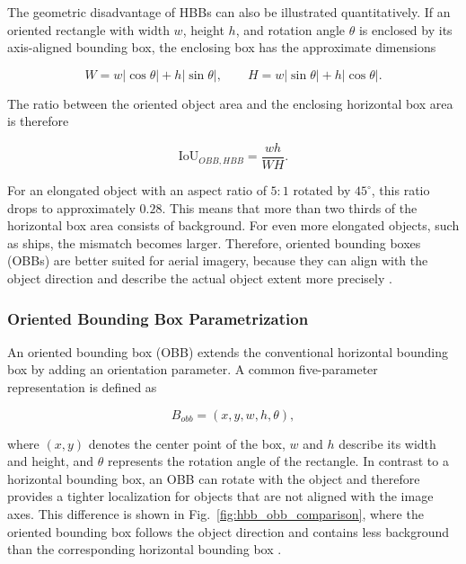 The geometric disadvantage of HBBs can also be illustrated quantitatively. If an oriented rectangle with width $w$, height $h$, and rotation angle $\theta$ is enclosed by its axis-aligned bounding box, the enclosing box has the approximate dimensions

\begin{equation}
    W = w|\cos\theta| + h|\sin\theta|,
    \qquad
    H = w|\sin\theta| + h|\cos\theta|.
\end{equation}

The ratio between the oriented object area and the enclosing horizontal box area is therefore

\begin{equation}
    \mathrm{IoU}_{OBB,HBB}
    =
    \frac{w h}{W H}.
\end{equation}

For an elongated object with an aspect ratio of $5:1$ rotated by $45^\circ$, this ratio drops to approximately $0.28$. This means that more than two thirds of the horizontal box area consists of background. For even more elongated objects, such as ships, the mismatch becomes larger. Therefore, oriented bounding boxes (OBBs) are better suited for aerial imagery, because they can align with the object direction and describe the actual object extent more precisely \cite{ding2021object,ding2018learning}.

\subsubsection{Oriented Bounding Box Parametrization}

An oriented bounding box (OBB) extends the conventional horizontal bounding box by adding an orientation parameter. A common five-parameter representation is defined as

\begin{equation}
    B_{obb} = (x, y, w, h, \theta),
\end{equation}

where $(x,y)$ denotes the center point of the box, $w$ and $h$ describe its width and height, and $\theta$ represents the rotation angle of the rectangle. In contrast to a horizontal bounding box, an OBB can rotate with the object and therefore provides a tighter localization for objects that are not aligned with the image axes. This difference is shown in Fig.~\ref{fig:hbb_obb_comparison}, where the oriented bounding box follows the object direction and contains less background than the corresponding horizontal bounding box \cite{ding2021object,yang2022arbitrary}.

